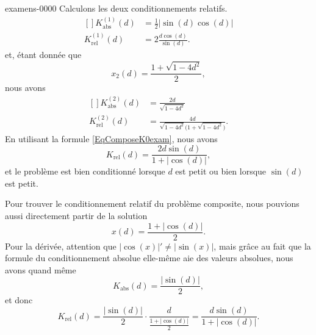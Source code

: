 \begin{corrige}{examens-0000}
Calculons les deux conditionnements relatifs.
\begin{equation}
	\begin{aligned}[]
		K_{\text{abs}}^{(1)}(d)&=\frac{ 1 }{2}| \sin(d)\cos(d) |\\
		K_{\text{rel}}^{(1)}(d)&=2\frac{ d\cos(d) }{ \sin(d) }.
	\end{aligned}
\end{equation}
et, étant donnée que
\begin{equation}		\label{EqComposeK0exam}
	x_2(d)=\frac{ 1+\sqrt{1-4d^2} }{2},
\end{equation}
nous avons
\begin{equation}
	\begin{aligned}[]
		K_{\text{abs}}^{(2)}(d)&=\frac{ 2d }{ \sqrt{1-4d^2} }\\
		K_{\text{rel}}^{(2)}(d)&=\frac{ 4d }{ \sqrt{1-4d^2}\big( 1+\sqrt{1-4d^2} \big) }.
	\end{aligned}
\end{equation}
En utilisant la formule \eqref{EqComposeK0exam}, nous avons
\begin{equation}
	K_{\text{rel}}(d)=\frac{ 2d\sin(d) }{ 1+| \cos(d) | },
\end{equation}
et le problème est bien conditionné lorsque $d$ est petit ou bien lorsque $\sin(d)$ est petit.

Pour trouver le conditionnement relatif du problème composite, nous pouvions aussi directement partir de la solution
\begin{equation}
	x(d)=\frac{ 1+| \cos(d) | }{2}.
\end{equation}
Pour la dérivée, attention que $| \cos(x) |'\neq| \sin(x) |$, mais grâce au fait que la formule du conditionnement absolue elle-même aie des valeurs absolues, nous avons quand même
\begin{equation}
	K_{\text{abs}}(d)=\frac{ | \sin(d) | }{2},
\end{equation}
 et donc
 \begin{equation}
	 K_{\text{rel}}(d)=\frac{ | \sin(d) | }{2}\cdot\frac{ d }{ \frac{ 1+| \cos(d) | }{2} }=\frac{ d\sin(d) }{ 1+| \cos(d) | }.
 \end{equation}

\end{corrige}
